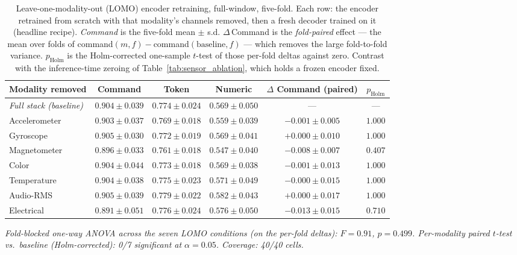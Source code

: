 \begin{table}[H]
\centering
\caption{Leave-one-modality-out (LOMO) encoder retraining, full-window, five-fold. Each row: the encoder retrained from scratch with that modality's channels removed, then a fresh decoder trained on it (headline recipe). \emph{Command} is the five-fold mean $\pm$ s.d. $\Delta$\,Command is the \emph{fold-paired} effect --- the mean over folds of command$(m,f)-$command$(\text{baseline},f)$ --- which removes the large fold-to-fold variance. $p_{\text{Holm}}$ is the Holm-corrected one-sample $t$-test of those per-fold deltas against zero. Contrast with the inference-time zeroing of Table~\ref{tab:sensor_ablation}, which holds a frozen encoder fixed.}
\label{tab:lomo_modality}
\small
\begin{tabular}{l c c c c c}
\toprule
\textbf{Modality removed} & \textbf{Command} & \textbf{Token} & \textbf{Numeric} & \textbf{$\Delta$ Command (paired)} & \textbf{$p_{\text{Holm}}$} \\
\midrule
\textit{Full stack (baseline)} & $0.904 \pm 0.039$ & $0.774 \pm 0.024$ & $0.569 \pm 0.050$ & --- & --- \\
Accelerometer & $0.903 \pm 0.037$ & $0.769 \pm 0.018$ & $0.559 \pm 0.039$ & $-0.001 \pm 0.005$ & $1.000$ \\
Gyroscope & $0.905 \pm 0.030$ & $0.772 \pm 0.019$ & $0.569 \pm 0.041$ & $+0.000 \pm 0.010$ & $1.000$ \\
Magnetometer & $0.896 \pm 0.033$ & $0.761 \pm 0.018$ & $0.547 \pm 0.040$ & $-0.008 \pm 0.007$ & $0.407$ \\
Color & $0.904 \pm 0.044$ & $0.773 \pm 0.018$ & $0.569 \pm 0.038$ & $-0.001 \pm 0.013$ & $1.000$ \\
Temperature & $0.904 \pm 0.038$ & $0.775 \pm 0.023$ & $0.571 \pm 0.049$ & $-0.000 \pm 0.015$ & $1.000$ \\
Audio-RMS & $0.905 \pm 0.039$ & $0.779 \pm 0.022$ & $0.582 \pm 0.043$ & $+0.000 \pm 0.017$ & $1.000$ \\
Electrical & $0.891 \pm 0.051$ & $0.776 \pm 0.024$ & $0.576 \pm 0.050$ & $-0.013 \pm 0.015$ & $0.710$ \\
\bottomrule
\end{tabular}
\par\smallskip
\footnotesize\textit{Fold-blocked one-way ANOVA across the seven LOMO conditions (on the per-fold deltas): $F=0.91$, $p=0.499$. Per-modality paired $t$-test vs.\ baseline (Holm-corrected): 0/7 significant at $\alpha=0.05$. Coverage: 40/40 cells.}
\end{table}
